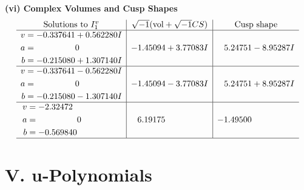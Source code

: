 \documentclass[1p]{elsarticle_modified}
\theoremstyle{definition}
\newcommand{\I}{\sqrt{-1}}
\begin{document}
\newpage\flushleft \textbf{(vi) Complex Volumes and Cusp Shapes}
$$\begin{array}{c|c|c}  
\text{Solutions to }I^v_{1}& \I (\text{vol} + \sqrt{-1}CS) & \text{Cusp shape}\\
 \hline 
\begin{aligned}
v &= -0.337641 + 0.562280 I \\
a &= \phantom{-0.000000 } 0 \\
b &= -0.215080 + 1.307140 I\end{aligned}
 & -1.45094 + 3.77083 I & \phantom{-}5.24751 - 8.95287 I \\ \hline\begin{aligned}
v &= -0.337641 - 0.562280 I \\
a &= \phantom{-0.000000 } 0 \\
b &= -0.215080 - 1.307140 I\end{aligned}
 & -1.45094 - 3.77083 I & \phantom{-}5.24751 + 8.95287 I \\ \hline\begin{aligned}
v &= -2.32472\phantom{ +0.000000I} \\
a &= \phantom{-0.000000 } 0 \\
b &= -0.569840\phantom{ +0.000000I}\end{aligned}
 & \phantom{-}6.19175\phantom{ +0.000000I} & -1.49500\phantom{ +0.000000I}\\
 \hline 
 \end{array}$$\newpage
\newpage\renewcommand{\arraystretch}{1}
\centering \section*{ V. u-Polynomials}
\end{document}
